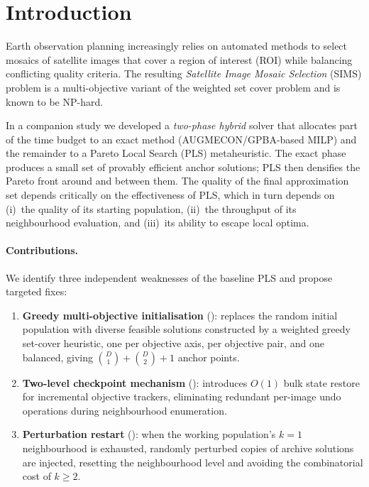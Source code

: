 \documentclass[11pt,a4paper]{article}
\begin{document}
\section{Introduction}\label{sec:intro}

Earth observation planning increasingly relies on automated methods to
select mosaics of satellite images that cover a region of interest (ROI)
while balancing conflicting quality criteria.  The resulting
\emph{Satellite Image Mosaic Selection} (SIMS) problem is a
multi-objective variant of the weighted set cover problem and is known to
be NP-hard.

In a companion study we developed a \emph{two-phase hybrid} solver that
allocates part of the time budget to an exact method
(AUGMECON/GPBA-based MILP) and the remainder to a Pareto Local Search
(PLS) metaheuristic.  The exact phase produces a small set of provably
efficient anchor solutions; PLS then densifies the Pareto front around
and between them.  The quality of the final approximation set depends
critically on the effectiveness of PLS, which in turn depends on (i)~the
quality of its starting population, (ii)~the throughput of its
neighbourhood evaluation, and (iii)~its ability to escape local optima.

\paragraph{Contributions.}
We identify three independent weaknesses of the baseline PLS and propose
targeted fixes:

\begin{enumerate}[leftmargin=*,nosep]
  \item \textbf{Greedy multi-objective initialisation}
    (): replaces the random initial population with
    diverse feasible solutions constructed by a weighted greedy set-cover
    heuristic, one per objective axis, per objective pair, and one
    balanced, giving $\binom{D}{1}+\binom{D}{2}+1$ anchor points.
  \item \textbf{Two-level checkpoint mechanism} ():
    introduces $O(1)$ bulk state restore for incremental objective
    trackers, eliminating redundant per-image undo operations during
    neighbourhood enumeration.
  \item \textbf{Perturbation restart} (): when the
    working population's $k{=}1$ neighbourhood is exhausted, randomly
    perturbed copies of archive solutions are injected, resetting the
    neighbourhood level and avoiding the combinatorial cost of
    $k{\ge}2$.
\end{enumerate}
\end{document}
